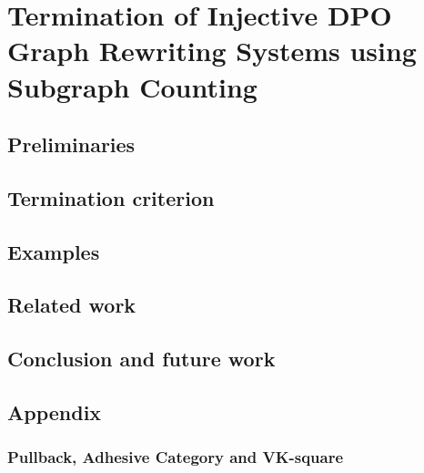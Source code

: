\documentclass{report}
\begin{document}
\chapter{Termination of Injective DPO Graph Rewriting
Systems using Subgraph Counting}
\label{chap:subgraph_counting}

\label{sec:intro}


\section{Preliminaries} 
\label{sec:pre} 


 
 
\section{Termination criterion}
\label{sec:termination} 

 

\section{Examples}
\label{sec:examples}


  
\section{Related work}
\label{sec:related_work} 


\section{Conclusion and future work}
\label{sec:conclusion} 


\section{Appendix}
\subsection*{Pullback, Adhesive Category and VK-square}

\end{document}
